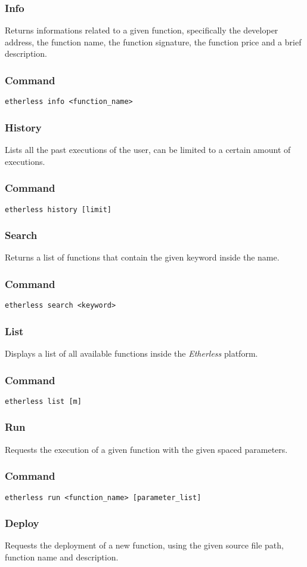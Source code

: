 	\subsubsection{Info}
	Returns informations related to a given function, specifically the developer address, the function name, the function signature, the function price and a brief description.
	\subsubsection*{Command}
	\texttt{etherless info <function\_name>}
	\subsubsection{History}
	Lists all the past executions of the user, can be limited to a certain amount of executions.
	\subsubsection*{Command}
	\texttt{etherless history [limit]}
	\subsubsection{Search}
	Returns a list of functions that contain the given keyword inside the name.
	\subsubsection*{Command}
	\texttt{etherless search <keyword>}
	\subsubsection{List}
	Displays a list of all available functions inside the \textit{Etherless} platform.
	\subsubsection*{Command}
	\texttt{etherless list [m]}
	\subsubsection{Run}
	Requests the execution of a given function with the given spaced parameters.
	\subsubsection*{Command}
	\texttt{etherless run <function\_name> [parameter\_list]}
	\subsubsection{Deploy}
	Requests the deployment of a new function, using the given source file path, function name and description.
